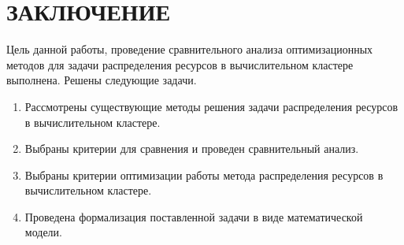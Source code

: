 \chapter*{ЗАКЛЮЧЕНИЕ}

Цель данной работы, проведение сравнительного анализа оптимизационных методов для задачи распределения ресурсов в вычислительном кластере выполнена. Решены следующие задачи.

\begin{enumerate}
	\item Рассмотрены существующие методы решения задачи распределения ресурсов в вычислительном кластере. 
	\item Выбраны критерии для сравнения и проведен сравнительный анализ. 
	\item Выбраны критерии оптимизации работы метода распределения ресурсов в вычислительном кластере. 
	\item Проведена формализация поставленной задачи в виде математической модели.
\end{enumerate}